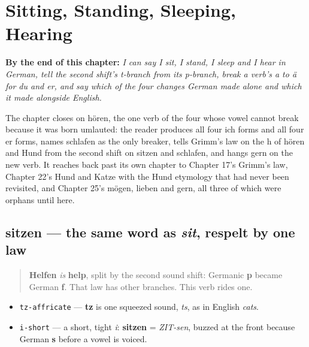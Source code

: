 
\chapter{Sitting, Standing, Sleeping, Hearing}
\label{ch:ge-still-verbs}

\begin{chapteropening}
\textbf{By the end of this chapter:} \emph{I can say I sit, I stand, I sleep and I hear in German, tell the second shift's t-branch from its p-branch, break a verb's a to ä for du and er, and say which of the four changes German made alone and which it made alongside English.}

The chapter closes on hören, the one verb of the four whose vowel cannot break because it was born umlauted: the reader produces all four ich forms and all four er forms, names schlafen as the only breaker, tells Grimm's law on the h of hören and Hund from the second shift on sitzen and schlafen, and hangs gern on the new verb. It reaches back past its own chapter to Chapter 17's Grimm's law, Chapter 22's Hund and Katze with the Hund etymology that had never been revisited, and Chapter 25's mögen, lieben and gern, all three of which were orphans until here.
\end{chapteropening}

\section[sitzen]{sitzen — the same word as \emph{sit}, respelt by one law}

\label{lesson:GE-C26-sitzen}



\begin{quote}
\textbf{Helfen} \emph{is} \textbf{help}, split by the second sound shift: Germanic \textbf{p} became German \textbf{f}. That law has other branches. This verb rides one.
\end{quote}

\begin{sounds}
\begin{itemize}
\raggedright
  \item \texttt{tz-affricate} — \textbf{tz} is one squeezed sound, \emph{ts}, as in English \emph{cats}.
  \item \texttt{i-short} — a short, tight \emph{i}: \textbf{sitzen} = \emph{ZIT-sen}, buzzed at the front because German \textbf{s} before a vowel is voiced.
\end{itemize}
\end{sounds}

